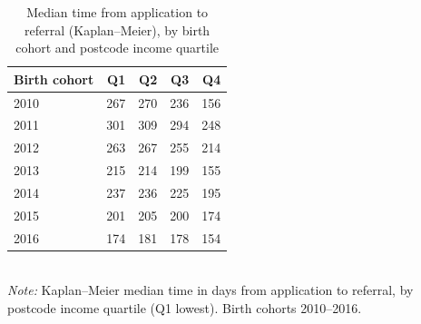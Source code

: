 \begin{table}[htbp]\centering
\caption{Median time from application to referral (Kaplan--Meier), by birth cohort and postcode income quartile}
\label{tab:S4b_espera_renda}
\small
\begin{tabular}{lrrrr}
\toprule
Birth cohort & Q1 & Q2 & Q3 & Q4 \\
\midrule
2010 & 267 & 270 & 236 & 156 \\
2011 & 301 & 309 & 294 & 248 \\
2012 & 263 & 267 & 255 & 214 \\
2013 & 215 & 214 & 199 & 155 \\
2014 & 237 & 236 & 225 & 195 \\
2015 & 201 & 205 & 200 & 174 \\
2016 & 174 & 181 & 178 & 154 \\
\bottomrule
\end{tabular}
\\[3pt]{\footnotesize \textit{Note:} Kaplan--Meier median time in days from application to referral, by postcode income quartile (Q1 lowest). Birth cohorts 2010--2016.}
\end{table}
